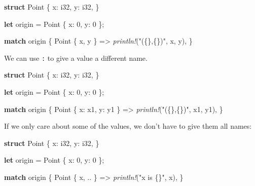 \documentclass[a4paper,]{book}
\newenvironment{Shaded}{\begin{snugshade}}{\end{snugshade}}
\newcommand{\KeywordTok}[1]{\textcolor[rgb]{0.13,0.29,0.53}{\textbf{{#1}}}}
\newcommand{\DataTypeTok}[1]{\textcolor[rgb]{0.13,0.29,0.53}{{#1}}}
\newcommand{\DecValTok}[1]{\textcolor[rgb]{0.00,0.00,0.81}{{#1}}}
\newcommand{\StringTok}[1]{\textcolor[rgb]{0.31,0.60,0.02}{{#1}}}
\newcommand{\PreprocessorTok}[1]{\textcolor[rgb]{0.56,0.35,0.01}{\textit{{#1}}}}
\newcommand{\NormalTok}[1]{{#1}}
\begin{document}
\begin{Shaded}
\begin{Highlighting}[]
\KeywordTok{struct} \NormalTok{Point \{}
    \NormalTok{x: }\DataTypeTok{i32}\NormalTok{,}
    \NormalTok{y: }\DataTypeTok{i32}\NormalTok{,}
\NormalTok{\}}

\KeywordTok{let} \NormalTok{origin = Point \{ x: }\DecValTok{0}\NormalTok{, y: }\DecValTok{0} \NormalTok{\};}

\KeywordTok{match} \NormalTok{origin \{}
    \NormalTok{Point \{ x, y \} => }\PreprocessorTok{println!}\NormalTok{(}\StringTok{"(\{\},\{\})"}\NormalTok{, x, y),}
\NormalTok{\}}
\end{Highlighting}
\end{Shaded}

We can use \texttt{:} to give a value a different name.

\begin{Shaded}
\begin{Highlighting}[]
\KeywordTok{struct} \NormalTok{Point \{}
    \NormalTok{x: }\DataTypeTok{i32}\NormalTok{,}
    \NormalTok{y: }\DataTypeTok{i32}\NormalTok{,}
\NormalTok{\}}

\KeywordTok{let} \NormalTok{origin = Point \{ x: }\DecValTok{0}\NormalTok{, y: }\DecValTok{0} \NormalTok{\};}

\KeywordTok{match} \NormalTok{origin \{}
    \NormalTok{Point \{ x: x1, y: y1 \} => }\PreprocessorTok{println!}\NormalTok{(}\StringTok{"(\{\},\{\})"}\NormalTok{, x1, y1),}
\NormalTok{\}}
\end{Highlighting}
\end{Shaded}

If we only care about some of the values, we don't have to give them all
names:

\begin{Shaded}
\begin{Highlighting}[]
\KeywordTok{struct} \NormalTok{Point \{}
    \NormalTok{x: }\DataTypeTok{i32}\NormalTok{,}
    \NormalTok{y: }\DataTypeTok{i32}\NormalTok{,}
\NormalTok{\}}

\KeywordTok{let} \NormalTok{origin = Point \{ x: }\DecValTok{0}\NormalTok{, y: }\DecValTok{0} \NormalTok{\};}

\KeywordTok{match} \NormalTok{origin \{}
    \NormalTok{Point \{ x, .. \} => }\PreprocessorTok{println!}\NormalTok{(}\StringTok{"x is \{\}"}\NormalTok{, x),}
\NormalTok{\}}
\end{Highlighting}
\end{Shaded}
\end{document}
